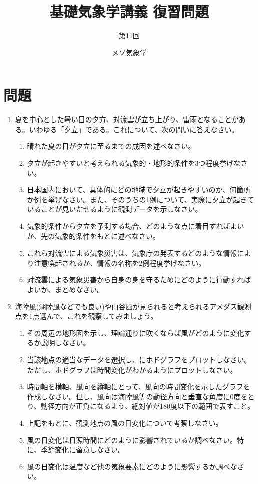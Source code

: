 \documentclass{jsarticle}
\newenvironment{problems}
{
  \renewcommand\labelenumi{\doublebox{\arabic{enumi}}}
  \begin{enumerate}
}{
  \end{enumerate}
  \renewcommand\labelenumi{\arabic{enumi}.}
}
\begin{document}
\title{基礎気象学講義 復習問題} %
\author{第11回} %
\date{メソ気象学} %
\maketitle

\section{問題}

    \begin{problems}
    \item 夏を中心とした暑い日の夕方、対流雲が立ち上がり、雷雨となることがある。いわゆる「夕立」である。これについて、次の問いに答えなさい。
        \begin{enumerate}[(1)]
        \item 晴れた夏の日が夕立に至るまでの成因を述べなさい。
        \item 夕立が起きやすいと考えられる気象的・地形的条件を3つ程度挙げなさい。
        \item 日本国内において、具体的にどの地域で夕立が起きやすいのか、何箇所か例を挙げなさい。また、そのうちの1例について、実際に夕立が起きていることが見いだせるように観測データを示しなさい。
        \item 気象的条件から夕立を予測する場合、どのような点に着目すればよいか、先の気象的条件をもとに述べなさい。
        \item これら対流雲による気象災害は、気象庁の発表するどのような情報により注意喚起されるか、情報の名称を2例程度挙げなさい。
        \item 対流雲による気象災害から自身の身を守るためにどのように行動すればよいか、まとめなさい。\\
        \end{enumerate}

    \item 海陸風(湖陸風などでも良い)や山谷風が見られると考えられるアメダス観測点を1点選んで、これを観察してみましょう。
        \begin{enumerate}[(1)]
        \item その周辺の地形図を示し、理論通りに吹くならば風がどのように変化するか説明しなさい。
        \item 当該地点の適当なデータを選択し、にホドグラフをプロットしなさい。ただし、ホドグラフは時間変化がわかるようにプロットしなさい。
        \item 時間軸を横軸、風向を縦軸にとって、風向の時間変化を示したグラフを作成しなさい。但し、風向は海陸風等の動径方向と垂直な角度に0度をとり、動径方向が正負になるよう、絶対値が180度以下の範囲で表すこと。
        \item 上記をもとに、観測地点の風の日変化について考察しなさい。
        \item 風の日変化は日照時間にどのように影響されているか調べなさい。特に、季節変化に留意しなさい。
        \item 風の日変化は温度など他の気象要素にどのように影響するか調べなさい。\\
        \end{enumerate}


\end{problems}
\end{document}
